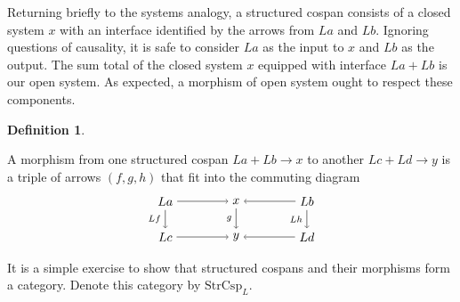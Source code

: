 \documentclass{amsart}
\newcommand{\StrCsp}{\cat{StrCsp}}
\newcommand{\cat}[1]{\mathrm{#1}}
\newcommand{\csp}[3]{#1 + #3 \to #2}
\theoremstyle{remark}
\theoremstyle{definition}
\newtheorem{definition}[theorem]{Definition}
\begin{document}
Returning briefly to the systems analogy, a structured cospan consists
of a closed system $ x $ with an interface identified by the arrows
from $ La $ and $ Lb $. Ignoring questions of causality, it is safe to
consider $ La $ as the input to $ x $ and $ Lb $ as the output. The
sum total of the closed system $ x $ equipped with interface
$ La + Lb $ is our open system. As expected, a morphism of open system
ought to respect these components.

\begin{definition} \label{df:morph-of-strcsp}

  A morphism from one structured cospan
  \(
    \csp{La}{x}{Lb}
  \)
  to another
  \(
    \csp{Lc}{y}{Ld}
  \)
  is a triple of arrows $ ( f,g,h ) $ that fit into the commuting
  diagram
  \[
    \begin{tikzpicture}
      \node (1) at (-2,1) {\( La \)};
      \node (2) at (0,1) {\( x \)};
      \node (3) at (2,1) {\( Lb \)};
      \node (4) at (-2,0) {\( Lc \)};
      \node (5) at (0,0) {\( y \)};
      \node (6) at (2,0) {\( Ld \)};
      \draw [->] (1) to node [above] {\scriptsize{\(  \)}} (2);
      \draw [->] (3) to node [above] {\scriptsize{\(  \)}} (2);
      \draw [->] (4) to node [below] {\scriptsize{\(  \)}} (5);
      \draw [->] (6) to node [below] {\scriptsize{\(  \)}} (5);
      \draw [->] (1) to node [left] {\scriptsize{\( Lf \)}} (4);
      \draw [->] (2) to node [left] {\scriptsize{\( g \)}} (5);
      \draw [->] (3) to node [left] {\scriptsize{\( Lh \)}} (6);
    \end{tikzpicture}
  \]
\end{definition}

It is a simple exercise to show that structured cospans and their
morphisms form a category.  Denote this category by $ \StrCsp_L
$. 

%
% 

\end{document}
